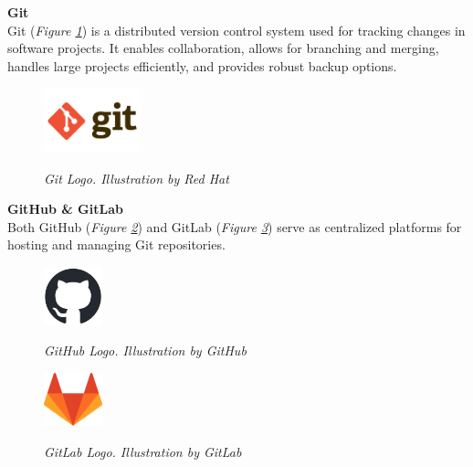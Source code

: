 \vspace{0.5cm}
\textbf{Git} \\

Git (\textit{Figure \ref{fig:git-logo}}) is a distributed version control system used for tracking changes in software projects. It enables collaboration, allows for branching and merging, handles large projects efficiently, and provides robust backup options.

\begin{figure}[H]
\centering
\begin{adjustbox}{trim=0cm 0.25cm, clip}
\includegraphics[width=0.25\textwidth]{imatges/studies_and_decisions/git-logo.jpg}
\end{adjustbox}
\caption[Git Logo]{\textit{Git Logo. Illustration by Red Hat}}
{\label{fig:git-logo}}
\end{figure}

\vspace{0.5cm}
\textbf{GitHub \& GitLab} \\

Both GitHub (\textit{Figure \ref{fig:github-logo}}) and GitLab (\textit{Figure \ref{fig:gitlab-logo}}) serve as centralized platforms for hosting and managing Git repositories.

\begin{figure}[H]
\centering
\begin{adjustbox}{trim=0cm 0cm, clip}
\includegraphics[width=0.15\textwidth]{imatges/studies_and_decisions/github-mark.png}
\end{adjustbox}
\caption[GitHub Logo]{\textit{GitHub Logo. Illustration by GitHub}}
{\label{fig:github-logo}}
\end{figure}

\begin{figure}[H]
\centering
\begin{adjustbox}{trim=0cm 0cm, clip}
\includegraphics[width=0.15\textwidth]{imatges/studies_and_decisions/gitlab-logo.png}
\end{adjustbox}
\caption[GitLab Logo]{\textit{GitLab Logo. Illustration by GitLab}}
{\label{fig:gitlab-logo}}
\end{figure}

